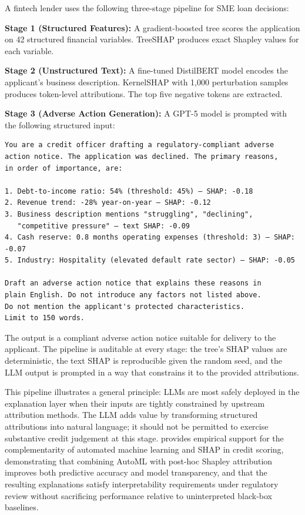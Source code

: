 \begin{example}
\label{ex:hybrid-credit-pipeline}
A fintech lender uses the following three-stage pipeline for SME loan decisions:

\textbf{Stage 1 (Structured Features):} A gradient-boosted tree scores the application
on 42 structured financial variables. TreeSHAP produces exact Shapley values for each
variable.

\textbf{Stage 2 (Unstructured Text):} A fine-tuned DistilBERT model encodes the
applicant's business description. KernelSHAP with 1,000 perturbation samples produces
token-level attributions. The top five negative tokens are extracted.

\textbf{Stage 3 (Adverse Action Generation):} A GPT-5 model is prompted with the
following structured input:

{\footnotesize
\begin{verbatim}
You are a credit officer drafting a regulatory-compliant adverse
action notice. The application was declined. The primary reasons,
in order of importance, are:

1. Debt-to-income ratio: 54% (threshold: 45%) — SHAP: -0.18
2. Revenue trend: -28% year-on-year — SHAP: -0.12
3. Business description mentions "struggling", "declining",
   "competitive pressure" — text SHAP: -0.09
4. Cash reserve: 0.8 months operating expenses (threshold: 3) — SHAP: -0.07
5. Industry: Hospitality (elevated default rate sector) — SHAP: -0.05

Draft an adverse action notice that explains these reasons in
plain English. Do not introduce any factors not listed above.
Do not mention the applicant's protected characteristics.
Limit to 150 words.
\end{verbatim}
}

The output is a compliant adverse action notice suitable for delivery to the applicant.
The pipeline is auditable at every stage: the tree's SHAP values are deterministic,
the text SHAP is reproducible given the random seed, and the LLM output is prompted in
a way that constrains it to the provided attributions.
\end{example}

This pipeline illustrates a general principle: LLMs are most safely deployed in the
explanation layer when their inputs are tightly constrained by upstream attribution
methods. The LLM adds value by transforming structured attributions into natural
language; it should not be permitted to exercise substantive credit judgement at this
stage. \citet{Schmitt2024} provides empirical support for the complementarity of
automated machine learning and SHAP in credit scoring, demonstrating that combining
AutoML with post-hoc Shapley attribution improves both predictive accuracy and model
transparency, and that the resulting explanations satisfy interpretability requirements
under regulatory review without sacrificing performance relative to uninterpreted black-box
baselines.

